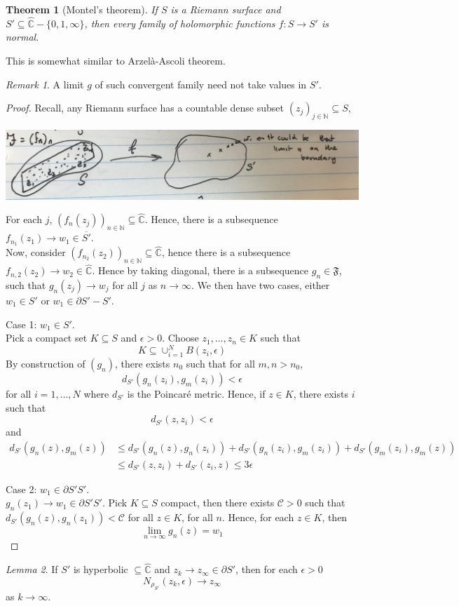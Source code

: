 \documentclass[a4paper, 11pt]{book}
\newtheorem{theorem}{Theorem}
\theoremstyle{definition}
\theoremstyle{remark}
\newtheorem*{remark}{Remark}
\newtheorem{lemma}[theorem]{Lemma}
\begin{document}
    \begin{theorem}[Montel's theorem]
        If $S$ is a Riemann surface and $S'\subseteq\hat{\mathbb{C}}-\{0,1,\infty\}$, then every family of holomorphic functions
        $f: S\to S'$ is normal.
    \end{theorem}

    This is somewhat similar to Arzelà-Ascoli theorem.

    \begin{remark}
        A limit $g$ of such convergent family need not take values in $S'$.
    \end{remark}

    \begin{proof}
        Recall, any Riemann surface has a countable dense subset $(z_j)_{j\in\mathbb{N}}\subseteq S$,
        \begin{center}
            \includegraphics[scale=0.05]{IMG_1024}
        \end{center}
        For each $j$, $(f_n(z_j))_{n\in\mathbb{N}}\subseteq\hat{\mathbb{C}}$. Hence, there is a subsequence $f_{n_1}(z_1)\to w_1\in
        \overline{S'}$.\\

        Now, consider $(f_{n_2}(z_2))_{n\in\mathbb{N}}\subseteq\hat{\mathbb{C}}$, hence there is a subsequence 
        $f_{n,2}(z_2)\to w_2\in\hat{\mathbb{C}}$. Hence by taking diagonal, there is a subsequence $g_n\in\mathfrak{F}$, such that
        $g_n(z_j) \to w_j$ for all $j$ as $n\to\infty$. We then have two cases, either $w_1\in S'$ or $w_1\in\partial{S'}-S'$.

        Case 1: $w_1\in S'$.\\
        Pick a compact set $K\subseteq S$ and $\epsilon>0$. Choose $z_1,\hdots,z_n\in K$ such that
        \[ K \subseteq \cup_{i=1}^N B(z_i,\epsilon) \]
        By construction of $(g_n)$, there exists $n_0$ such that for all $m,n > n_0$,
        \[ d_{S'}(g_n(z_i),g_m(z_i)) < \epsilon \]
        for all $i = 1,\hdots,N$ where $d_{S'}$ is the Poincaré metric. Hence, if $z\in K$, there exists $i$ such that
        \[ d_{S'}(z,z_i)<\epsilon \]
        and
        \begin{align*}
            d_{S'}(g_n(z),g_m(z)) &\leq d_{S'}(g_n(z),g_n(z_i)) + d_{S'}(g_n(z_i),g_m(z_i)) + d_{S'}(g_m(z_i),g_m(z)) \\
            &\leq d_{S'}(z,z_i) + d_{S'}(z_i,z) \leq 3\epsilon
        \end{align*}

        Case 2: $w_1\in \partial{S'}{S'}$.\\
        $g_n(z_1)\to w_1\in \partial{S'}{S'}$. Pick $K\subseteq S$ compact, then there exists $\mathcal{C}>0$ such that
        $d_{S'}(g_n(z),g_n(z_1)) < \mathcal{C}$ for all $z\in K$, for all $n$. Hence, for each $z\in K$, then
        \[ \lim_{n\to\infty} g_n(z) = w_1 \]
    \end{proof}

    \begin{lemma}
        If $S'$ is hyperbolic $\subseteq \hat{\mathbb{C}}$ and $z_k\to z_{\infty}\in \partial{S'}$, then for each $\epsilon>0$
        \[ N_{\rho_{S'}}(z_k,\epsilon) \to z_{\infty} \]
        as $k\to\infty$.
    \end{lemma}
\end{document}
